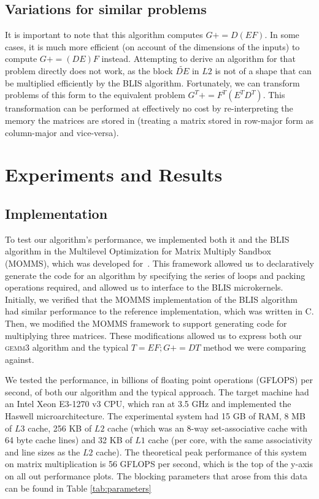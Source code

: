 \documentclass[12pt]{article}
\newcommand*{\pluseq}{\mathrel{{+}{=}}}
\newcommand*{\gemmt}{{\textsc{gemm3}}}
\newcommand*{\mycite}[1]{~\cite{#1}}
\begin{document}
\subsection{Variations for similar problems}
It is important to note that this algorithm computes $G \pluseq D(EF)$.
In some cases, it is much more efficient (on account of the dimensions of the inputs) to compute $G \pluseq (DE)F$ instead.
Attempting to derive an algorithm for that problem directly does not work, as the block $\widetilde{DE}$ in $L2$ is not of a shape that can be multiplied efficiently by the BLIS algorithm.
Fortunately, we can transform problems of this form to the equivalent problem $G^T \pluseq F^T(E^TD^T)$.
This transformation can be performed at effectively no cost by re-interpreting the memory the matrices are stored in (treating a matrix stored in row-major form as column-major and vice-versa).

\section{Experiments and Results}
\subsection{Implementation}
To test our algorithm's performance, we implemented both it and the BLIS algorithm in the Multilevel Optimization for Matrix Multiply Sandbox (MOMMS), which was developed for\mycite{SmithDiss2017}.
This framework allowed us to declaratively generate the code for an algorithm by specifying the series of loops and packing operations required, and allowed us to interface to the BLIS microkernels.
Initially, we verified that the MOMMS implementation of the BLIS algorithm had similar performance to the reference implementation, which was written in C.
Then, we modified the MOMMS framework to support generating code for multiplying three matrices.
These modifications allowed us to express both our \gemmt{} algorithm and the typical $T = EF; G \pluseq DT$ method we were comparing against.

We tested the performance, in billions of floating point operations (GFLOPS) per second, of both our algorithm and the typical approach.
The target machine had an Intel Xeon E3-1270 v3 CPU, which ran at 3.5 GHz and implemented the Haswell microarchitecture.
The experimental system had 15 GB of RAM, 8 MB of $L3$ cache, 256 KB of $L2$ cache (which was an 8-way set-associative cache with 64 byte cache lines) and 32 KB of $L1$ cache (per core, with the same associativity and line sizes as the $L2$ cache).
The theoretical peak performance of this system on matrix multiplication is 56 GFLOPS per second, which is the top of the y-axis on all out performance plots.
The blocking parameters that arose from this data can be found in Table \ref{tab:parameters}
\end{document}
